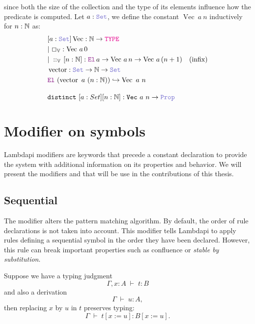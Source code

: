 \begin{definition}\label{def:dependent-vector}
since both the size of the collection and the type of its elements influence how the predicate is computed.
Let \( a : \set \), we define the constant \( \mathop{\mathrm{Vec}}~a~n \) inductively for \( n : \mathbb{N} \) as:
\begin{align*}
&[a: \set] \mathop{\mathrm{Vec}}: \N \ra \type \\
&|~\Box_\bb{V} : \mathop{\mathrm{Vec}}\,a\, 0 \\
&|~\mathbin{::}_\bb{V}\,[n:\N]: \el\,a \ra \mathop{\mathrm{Vec}}\,a\,n \ra  \mathop{\mathrm{Vec}}\,a\,(n +1) \quad (\text{infix})\\
&\mathop{\mathrm{vector}}: \set \ra \N \ra \set \\
&\el~(\mathop{\mathrm{vector}}~a~(n: \N)) \re \mathop{\mathrm{Vec}}~a~n \\[1em]
& \kw{distinct}~[a: Set] [n: \N] : \kw{Vec}~a~n \ra \prop
\end{align*}
\end{definition}

\section{Modifier on symbols}

Lambdapi modifiers are keywords that precede a constant declaration to provide the system with additional information on its properties and behavior.
We will present the modifiers  and  that will be use in the contributions of this thesis.

\subsection{Sequential}

The modifier  alters the pattern matching algorithm.
By default, the order of rule declarations is not taken into account.
This modifier tells Lambdapi to apply rules defining a sequential symbol in the order they have been declared.
However, this rule can break important properties such as confluence or \emph{stable by substitution}.

\begin{lemma}\label{lem:stability}
Suppose we have a typing judgment
\[
  \Gamma, x : A \;\vdash\; t : B
\]
and also a derivation
\[
  \Gamma \;\vdash\; u : A ,
\]
then replacing $x$ by $u$ in $t$ preserves typing:
\[
  \Gamma \;\vdash\; t[x := u] : B[x := u] .
\]
\end{lemma}

